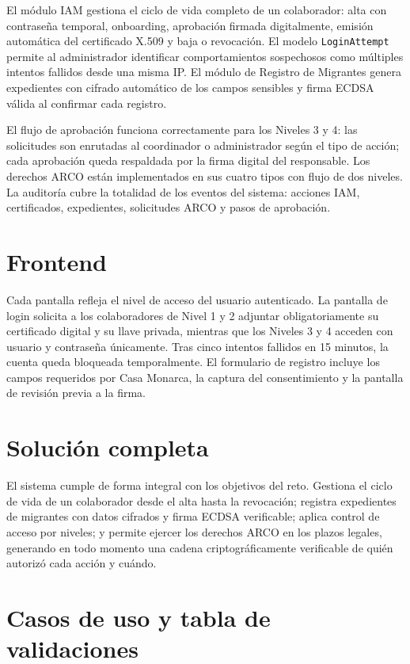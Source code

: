 \documentclass[10pt,letterpaper]{report}
\begin{document}
El módulo IAM gestiona el ciclo de vida completo de un colaborador: alta con contraseña temporal, onboarding, aprobación firmada digitalmente, emisión automática del certificado X.509 y baja o revocación. El modelo \texttt{LoginAttempt} permite al administrador identificar comportamientos sospechosos como múltiples intentos fallidos desde una misma IP. El módulo de Registro de Migrantes genera expedientes con cifrado automático de los campos sensibles y firma ECDSA válida al confirmar cada registro.

El flujo de aprobación funciona correctamente para los Niveles 3 y 4: las solicitudes son enrutadas al coordinador o administrador según el tipo de acción; cada aprobación queda respaldada por la firma digital del responsable. Los derechos ARCO están implementados en sus cuatro tipos con flujo de dos niveles. La auditoría cubre la totalidad de los eventos del sistema: acciones IAM, certificados, expedientes, solicitudes ARCO y pasos de aprobación.

\section{Frontend}

Cada pantalla refleja el nivel de acceso del usuario autenticado. La pantalla de login solicita a los colaboradores de Nivel 1 y 2 adjuntar obligatoriamente su certificado digital y su llave privada, mientras que los Niveles 3 y 4 acceden con usuario y contraseña únicamente. Tras cinco intentos fallidos en 15 minutos, la cuenta queda bloqueada temporalmente. El formulario de registro incluye los campos requeridos por Casa Monarca, la captura del consentimiento y la pantalla de revisión previa a la firma.

\section{Solución completa}

El sistema cumple de forma integral con los objetivos del reto. Gestiona el ciclo de vida de un colaborador desde el alta hasta la revocación; registra expedientes de migrantes con datos cifrados y firma ECDSA verificable; aplica control de acceso por niveles; y permite ejercer los derechos ARCO en los plazos legales, generando en todo momento una cadena criptográficamente verificable de quién autorizó cada acción y cuándo.

\section{Casos de uso y tabla de validaciones}
\end{document}
